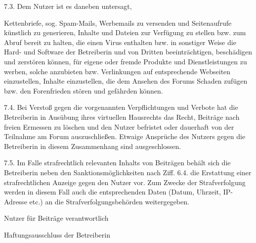 7.3. Dem Nutzer ist es daneben untersagt,

    Kettenbriefe, sog. Spam-Mails, Werbemails zu versenden und Seitenaufrufe künstlich zu generieren,
    Inhalte und Dateien zur Verfügung zu stellen bzw. zum Abruf bereit zu halten, die einen Virus enthalten bzw. in sonstiger Weise die Hard- und Software der Betreiberin und von Dritten beeinträchtigen, beschädigen und zerstören können,
    für eigene oder fremde Produkte und Dienstleistungen zu werben, solche anzubieten bzw. Verlinkungen auf entsprechende Webseiten einzustellen,
    Inhalte einzustellen, die dem Ansehen des Forums Schaden zufügen bzw. den Forenfrieden stören und gefährden können.


7.4. Bei Verstoß gegen die vorgenannten Verpflichtungen und Verbote hat die Betreiberin in Ausübung ihres virtuellen Hausrechts das Recht, Beiträge nach freien Ermessen zu löschen und den Nutzer befristet oder dauerhaft von der Teilnahme am Forum auszuschließen. Etwaige Ansprüche des Nutzers gegen die Betreiberin in diesem Zusammenhang sind ausgeschlossen.

7.5. Im Falle strafrechtlich relevanten Inhalts von Beiträgen behält sich die Betreiberin neben den Sanktionsmöglichkeiten nach Ziff. 6.4. die Erstattung einer strafrechtlichen Anzeige gegen den Nutzer vor. Zum Zwecke der Strafverfolgung werden in diesem Fall auch die entsprechenden Daten (Datum, Uhrzeit, IP-Adresse etc.) an die Strafverfolgungsbehörden weitergegeben.

Nutzer für Beiträge verantwortlich

Haftungsausschluss der Betreiberin











